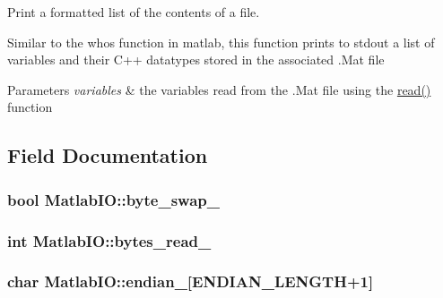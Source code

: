 Print a formatted list of the contents of a file. 

Similar to the \textquotesingle{}whos\textquotesingle{} function in matlab, this function prints to stdout a list of variables and their C++ datatypes stored in the associated .Mat file 
\begin{DoxyParams}{Parameters}
{\em variables} & the variables read from the .Mat file using the \hyperlink{classMatlabIO_aa6bcbec37f79990c3b9b5cd1d4d15c1c}{read()} function \\
\hline
\end{DoxyParams}


\subsection{Field Documentation}
\hypertarget{classMatlabIO_a5b205de924e7d93cce1878b96e8090ef}{}
\subsubsection[{byte\+\_\+swap\+\_\+}]{\setlength{\rightskip}{0pt plus 5cm}bool Matlab\+I\+O\+::byte\+\_\+swap\+\_\+\hspace{0.3cm}{\ttfamily [private]}}\label{classMatlabIO_a5b205de924e7d93cce1878b96e8090ef}
\hypertarget{classMatlabIO_a4af107166f7a854356b85a8ba8e2a575}{}
\subsubsection[{bytes\+\_\+read\+\_\+}]{\setlength{\rightskip}{0pt plus 5cm}int Matlab\+I\+O\+::bytes\+\_\+read\+\_\+\hspace{0.3cm}{\ttfamily [private]}}\label{classMatlabIO_a4af107166f7a854356b85a8ba8e2a575}
\hypertarget{classMatlabIO_a506fbbf7c76a1de2714f5fdc8d8ce891}{}
\subsubsection[{endian\+\_\+}]{\setlength{\rightskip}{0pt plus 5cm}char Matlab\+I\+O\+::endian\+\_\+\mbox{[}{\bf E\+N\+D\+I\+A\+N\+\_\+\+L\+E\+N\+G\+T\+H}+1\mbox{]}\hspace{0.3cm}{\ttfamily [private]}}\label{classMatlabIO_a506fbbf7c76a1de2714f5fdc8d8ce891}
\hypertarget{classMatlabIO_a1eea9aa8bc8c8d92d70f75d1f2280357}{}

